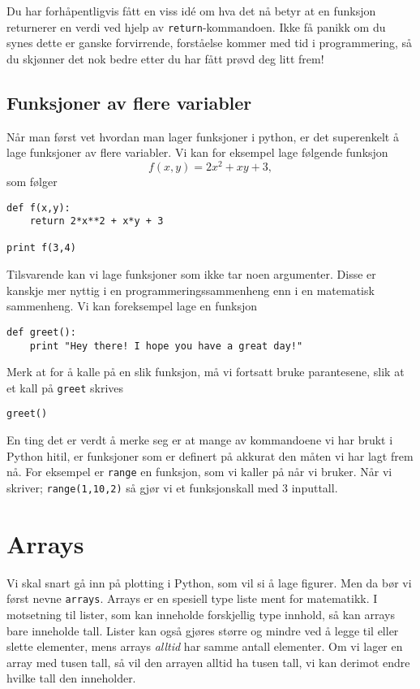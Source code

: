 \documentclass[a4paper, 11pt, notitlepage]{article}
\begin{document}
Du har forhåpentligvis fått en viss idé om hva det nå betyr at en funksjon returnerer en verdi ved hjelp av \verb+return+-kommandoen. Ikke få panikk om du synes dette er ganske forvirrende, forståelse kommer med tid i programmering, så du skjønner det nok bedre etter du har fått prøvd deg litt frem!

\subsection{Funksjoner av flere variabler}
Når man først vet hvordan man lager funksjoner i python, er det superenkelt å lage funksjoner av flere variabler. Vi kan for eksempel lage følgende funksjon
$$f(x,y) = 2x^2 + xy + 3,$$
som følger
\begin{lstlisting}
def f(x,y):
    return 2*x**2 + x*y + 3

print f(3,4)
\end{lstlisting}
\vspace{-0.3cm}
Tilsvarende kan vi lage funksjoner som ikke tar noen argumenter. Disse er kanskje mer nyttig i en programmeringssammenheng enn i en matematisk sammenheng. Vi kan foreksempel lage en funksjon
\begin{lstlisting}
def greet():
    print "Hey there! I hope you have a great day!"
\end{lstlisting}
\vspace{-0.3cm}
Merk at for å kalle på en slik funksjon, må vi fortsatt bruke parantesene, slik at et kall på \verb+greet+ skrives
\begin{lstlisting}
greet()
\end{lstlisting}

En ting det er verdt å merke seg er at mange av kommandoene vi har brukt i Python hitil, er funksjoner som er definert på akkurat den måten vi har lagt frem nå. For eksempel er \verb+range+ en funksjon, som vi kaller på når vi bruker. Når vi skriver; \verb+range(1,10,2)+ så gjør vi et funksjonskall med 3 inputtall.

\clearpage

\section{Arrays}

Vi skal snart gå inn på plotting i Python, som vil si å lage figurer. Men da bør vi først nevne \verb+arrays+. Arrays er en spesiell type liste ment for matematikk. I motsetning til lister, som kan inneholde forskjellig type innhold, så kan arrays bare inneholde tall. Lister kan også gjøres større og mindre ved å legge til eller slette elementer, mens arrays \emph{alltid} har samme antall elementer. Om vi lager en array med tusen tall, så vil den arrayen alltid ha tusen tall, vi kan derimot endre hvilke tall den inneholder.
\end{document}

